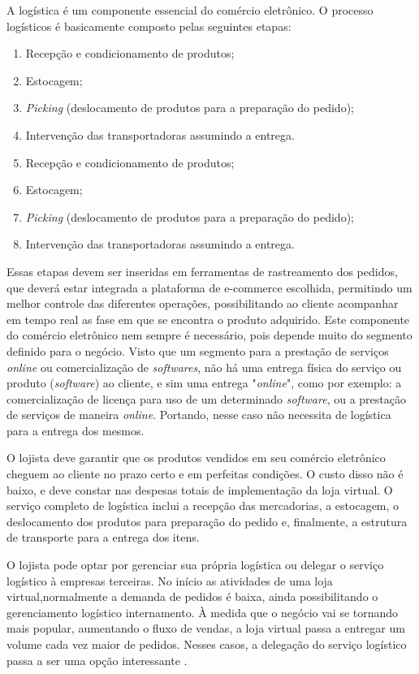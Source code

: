 A logística é um componente essencial do comércio eletrônico. O processo logísticos é basicamente composto pelas seguintes etapas:

\begin{enumerate}
	\item Recepção e condicionamento de produtos;
	\item Estocagem;
	\item \textit{Picking} (deslocamento de  produtos para a preparação do pedido);
	\item Intervenção das transportadoras assumindo a entrega.
	\item Recepção e condicionamento de produtos;
	\item Estocagem;
	\item \textit{Picking} (deslocamento de  produtos para a preparação do pedido);
	\item Intervenção das transportadoras assumindo a entrega.
\end{enumerate}

Essas etapas devem ser inseridas em ferramentas de rastreamento dos pedidos, que deverá estar integrada a plataforma de e-commerce escolhida, permitindo um melhor controle das diferentes operações, possibilitando ao cliente acompanhar em tempo real as fase em que se encontra o produto adquirido. Este componente do comércio eletrônico nem sempre é necessário, pois depende muito do segmento definido para o negócio. Visto que um segmento para a prestação de serviços \textit{online} ou comercialização de \textit{softwares}, não há uma entrega física do serviço ou produto (\textit{software}) ao cliente, e sim uma entrega "\textit{online}", como por exemplo: a comercialização de licença para uso de um determinado \textit{software}, ou a prestação de serviços de maneira \textit{online}. Portando, nesse caso não necessita de logística para a entrega dos mesmos. 

O lojista deve garantir que os produtos vendidos em seu comércio eletrônico cheguem ao cliente no prazo certo e em perfeitas condições. O custo disso não é baixo, e deve constar nas despesas totais de implementação da loja virtual. O serviço completo de logística inclui a recepção das mercadorias, a estocagem, o deslocamento dos produtos para preparação do pedido e, finalmente, a estrutura de transporte para a entrega dos itens.

O lojista pode optar por gerenciar sua própria logística ou delegar o serviço logístico à empresas terceiras. No início as atividades de uma loja virtual,normalmente a demanda de pedidos é baixa, ainda possibilitando o gerenciamento logístico internamento.  À medida que o negócio vai se tornando mais popular, aumentando o fluxo de vendas, a loja virtual passa a entregar um volume cada vez maior de pedidos. Nesses casos, a delegação do serviço logístico passa a ser uma opção interessante \cite{Guiadeecommerce2015}.

